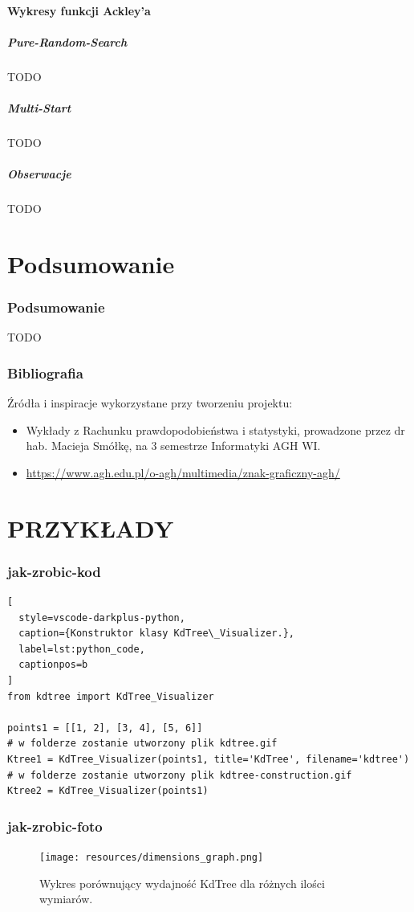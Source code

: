 \documentclass{lab}
\begin{document}
\subsection{Wykresy funkcji Ackley’a}
\subsubsection{Pure-Random-Search}
TODO

\subsubsection{Multi-Start}
TODO

\subsubsection{Obserwacje}
TODO

\newpage
\part{Podsumowanie}
\section{Podsumowanie}
TODO

\newpage
\section{Bibliografia}
Źródła i inspiracje wykorzystane przy tworzeniu projektu:
\begin{itemize}
  \item Wykłady z Rachunku prawdopodobieństwa i statystyki, prowadzone przez dr hab. Macieja Smółkę, na 3 semestrze Informatyki AGH WI.
  \item \url{https://www.agh.edu.pl/o-agh/multimedia/znak-graficzny-agh/}
\end{itemize}





\part{PRZYKŁADY}
\section{jak-zrobic-kod}
\begin{lstlisting}[
  style=vscode-darkplus-python,
  caption={Konstruktor klasy KdTree\_Visualizer.},
  label=lst:python_code,
  captionpos=b
]
from kdtree import KdTree_Visualizer

points1 = [[1, 2], [3, 4], [5, 6]]
# w folderze zostanie utworzony plik kdtree.gif
Ktree1 = KdTree_Visualizer(points1, title='KdTree', filename='kdtree')
# w folderze zostanie utworzony plik kdtree-construction.gif
Ktree2 = KdTree_Visualizer(points1)
\end{lstlisting}

\section{jak-zrobic-foto}
\begin{figure}[H]
  \centering
  \texttt{[image: resources/dimensions\_graph.png]}
  \caption{Wykres porównujący wydajność KdTree dla różnych ilości wymiarów.}
  \label{fig:dimensions_graph}
\end{figure}
\end{document}
